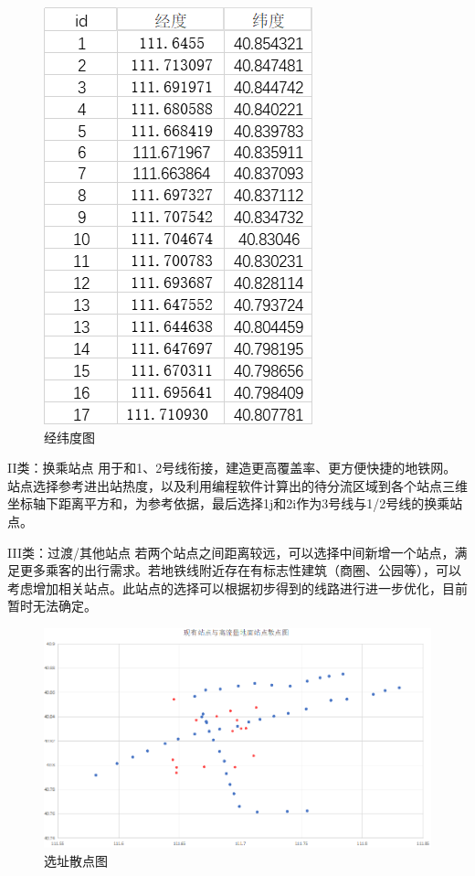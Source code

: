 \documentclass[12pt,a4paper]{mcmthesis}
\begin{document}
    \begin{figure}[h!t]
        \centerline{\includegraphics[scale=1]{figures/经纬度图}\quad
        }
        \caption{\song\wuhao
        经纬度图}
        \label{fig:经纬度图}
    \end{figure}

    II类：换乘站点
    用于和1、2号线衔接，建造更高覆盖率、更方便快捷的地铁网。站点选择参考进出站热度，以及利用编程软件计算出的待分流区域到各个站点三维坐标轴下距离平方和，为参考依据，最后选择1j和2i作为3号线与1/2号线的换乘站点。

    III类：过渡/其他站点
    若两个站点之间距离较远，可以选择中间新增一个站点，满足更多乘客的出行需求。若地铁线附近存在有标志性建筑（商圈、公园等），可以考虑增加相关站点。此站点的选择可以根据初步得到的线路进行进一步优化，目前暂时无法确定。

    \begin{figure}[h!t]
        \centerline{\includegraphics[scale=1]{figures/选址散点图}\quad
        }
        \caption{\song\wuhao
        选址散点图}
        \label{fig:选址散点图}
    \end{figure}
\end{document}
